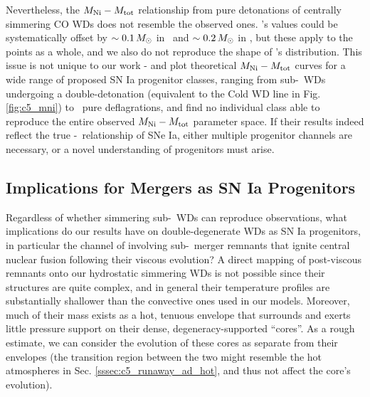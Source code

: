

Nevertheless, the $\MNi-\Mtot$ relationship from pure detonations of centrally simmering CO WDs does not resemble the observed ones.  \cite{chil+15}'s values could be systematically offset by $\sim 0.1\,\Msun$ in \Mtot\ and $\sim 0.2\,\Msun$ in \MNi, but these apply to the points as a whole, and we also do not reproduce the shape of \cite{chil+15}'s distribution.  This issue is not unique to our work - \cite{scalzrs14} and \cite{chil+15} plot theoretical $\MNi-\Mtot$ curves for a wide range of proposed SN Ia progenitor classes, ranging from sub-\Mch\ WDs undergoing a double-detonation (equivalent to the Cold WD line in Fig. \ref{fig:c5_mni}) to \Mch\ pure deflagrations, and find no individual class able to reproduce the entire observed $\MNi-\Mtot$ parameter space.  If their results indeed reflect the true \Mtot-\Ni\ relationship of SNe Ia, either multiple progenitor channels are necessary, or a novel understanding of progenitors must arise.


\subsection{Implications for Mergers as SN Ia Progenitors}
\label{ssec:c5_implications}

Regardless of whether simmering sub-\Mch\ WDs can reproduce observations, what implications do our results have on double-degenerate WDs as SN Ia progenitors, in particular the channel of \citeal{vkercj10} involving sub-\Mch\ merger remnants that ignite central nuclear fusion following their viscous evolution?  A direct mapping of post-viscous remnants onto our hydrostatic simmering WDs is not possible since their structures are quite complex, and in general their temperature profiles are substantially shallower than the convective ones used in our models.  Moreover, much of their mass exists as a hot, tenuous envelope that surrounds and exerts little pressure support on their dense, degeneracy-supported ``cores''.  As a rough estimate, we can consider the evolution of these cores as separate from their envelopes (the transition region between the two might resemble the hot atmospheres in Sec. \ref{sssec:c5_runaway_ad_hot}, and thus not affect the core's evolution).


